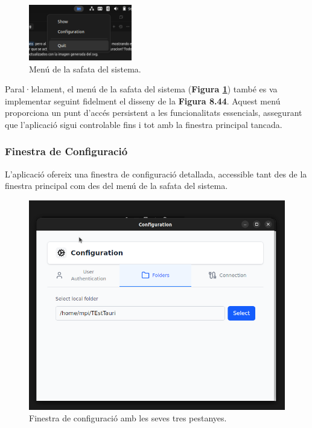 \begin{figure}[H]
    \centering
    \includegraphics[width=0.4\textwidth]{Figures/ui-desktop/tray_options.png}
    \caption{Menú de la safata del sistema.}
    \label{fig:desktop-tray-impl}
\end{figure}

Paral·lelament, el menú de la safata del sistema (\textbf{Figura \ref{fig:desktop-tray-impl}}) també es va implementar seguint fidelment el disseny de la \textbf{Figura 8.44}. Aquest menú proporciona un punt d'accés persistent a les funcionalitats essencials, assegurant que l'aplicació sigui controlable fins i tot amb la finestra principal tancada.

\subsubsection{Finestra de Configuració}
L'aplicació ofereix una finestra de configuració detallada, accessible tant des de la finestra principal com des del menú de la safata del sistema.

\begin{figure}[H]
    \centering
    \includegraphics[width=\textwidth]{Figures/ui-desktop/configuration_desktop.png}
    \caption{Finestra de configuració amb les seves tres pestanyes.}
    \label{fig:desktop-config-impl}
\end{figure}

